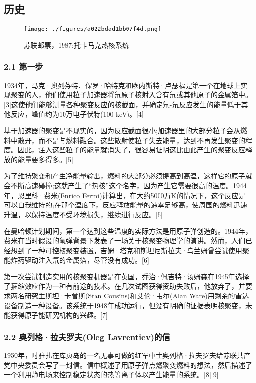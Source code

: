 \subsection{历史}
\begin{figure}[ht]
\centering
\texttt{[image: ./figures/a022bdad1bb07f4d.png]}
\caption{苏联邮票，1987:托卡马克热核系统} \label{fig_TKMK_1}
\end{figure}
\subsubsection{2.1 第一步}
1934年，马克·奥列芬特、保罗·哈特克和欧内斯特·卢瑟福是第一个在地球上实现聚变的人，他们使用粒子加速器将氘原子核射入含有氘或其他原子的金属箔中。[3]这使他们能够测量各种聚变反应的核截面，并确定氘-氘反应发生的能量低于其他反应，峰值约为10万电子伏特(100 keV)。[4]

基于加速器的聚变是不现实的，因为反应截面很小;加速器里的大部分粒子会从燃料中散开，而不是与燃料融合。这些散射使粒子失去能量，达到不再发生聚变的程度。因此，注入这些粒子的能量就消失了，很容易证明这比由此产生的聚变反应释放的能量要多得多。[5]

为了维持聚变和产生净能量输出，燃料的大部分必须提高到高温，这样它的原子就会不断高速碰撞;这就产生了“热核”这个名字，因为产生它需要很高的温度。1944年，恩里科·费米(Enrico Fermi)计算出，在大约5000万K的情况下，这个反应是可以自我维持的;在那个温度下，反应释放能量的速率足够高，使周围的燃料迅速升温，以保持温度不受环境损失，继续进行反应。[5]

在曼哈顿计划期间，第一个达到这些温度的实际方法是用原子弹创造的。1944年，费米在当时假设的氢弹背景下发表了一场关于核聚变物理学的演讲。然而，人们已经想到了一种可控核聚变装置，吉姆·塔克和斯坦尼斯拉夫·乌兰姆曾尝试使用聚能炸药驱动注入氘的金属箔，尽管没有成功。[6]

第一次尝试制造实用的核聚变机器是在英国，乔治·佩吉特·汤姆森在1945年选择了箍缩效应作为一种有前途的技术。在几次试图获得资助失败后，他放弃了，并要求两名研究生斯坦·卡曾斯(Stan Cousins)和艾伦·韦尔(Alan Ware)用剩余的雷达设备制造一种设备。该系统于1948年成功运行，但没有明确的证据表明核聚变，未能获得原子能研究机构的兴趣。[7]
\subsubsection{2.2 奥列格·拉夫罗夫(Oleg Lavrentiev)的信}
1950年，时驻扎在库页岛的一名无事可做的红军中士奥列格·拉夫罗夫给苏联共产党中央委员会写了一封信。信中概述了用原子弹点燃聚变燃料的想法，然后描述了一个利用静电场来控制稳定状态的热等离子体以产生能量的系统。[8][9]

